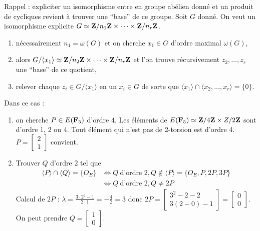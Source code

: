 	Rappel : expliciter un isomorphisme entre en groupe abélien donné et un produit de cycliques revient à trouver une “base” de ce groupe.
	Soit $G$ donné.
	On veut un isomorphisme explicite $G \simeq \mathbf{Z} / n_1\mathbf{Z} \times \cdots \times \mathbf{Z} / n_r\mathbf{Z}$.
	\begin{enumerate}[1.]
		\item nécessairement $n_1 = \omega(G)$ et on cherche $x_1 \in G$ d'ordre maximal $\omega(G)$,
		\item alors $G / \langle x_1 \rangle \simeq \mathbf{Z} / n_2\mathbf{Z} \times \cdots \times \mathbf{Z} / n_r\mathbf{Z}$ et l'on trouve récursivement $z_2,\ldots,z_r$ une “base” de ce quotient,
		\item relever chaque $z_i \in G / \langle x_1 \rangle$ en un $x_i \in G$ de sorte que $\langle x_1 \rangle \cap \langle x_2,\ldots,x_r \rangle = \{ 0 \}$.\\
	\end{enumerate}
	
	Dans ce cas :
	\begin{enumerate}[(1)]
		\item on cherche $P \in E(\mathbf{F}_5)$ d'ordre 4.
			Les éléments de $E(\mathbf{F}_5) \simeq \mathbf{Z}/4\mathbf{Z} \times Z/2\mathbf{Z}$ sont d'ordre 1, 2 ou 4.
			Tout élément qui n'est pas de 2-torsion est d'ordre 4.
			$P = \begin{bmatrix} 2 \\ 1 \end{bmatrix}$ convient.
		\item Trouver $Q$ d'ordre 2 tel que
			\begin{align*}
				\langle P \rangle \cap \langle Q \rangle = \{ O_E \} & \iff Q\ \text{d'ordre 2}, Q \not\in \langle P \rangle = \{ O_E, P, 2P, 3P \} \\
				                                                     & \iff Q\ \text{d'ordre 2}, Q \neq  2P
			\end{align*}
			Calcul de $2P$ : $\lambda = \frac{3 \cdot 2^2 - 1}{2 \cdot 1} = -\frac{4}{2} = 3$ donc $2P = \begin{bmatrix} 3^2 - 2 - 2 \\ 3(2 - 0) - 1 \end{bmatrix} = \begin{bmatrix} 0 \\ 0 \end{bmatrix}$.
			On peut prendre $Q = \begin{bmatrix} 1 \\ 0 \end{bmatrix}$.
	\end{enumerate}
	
